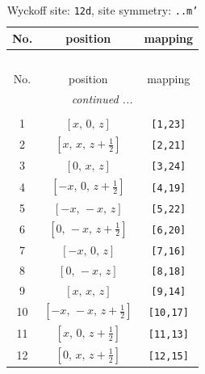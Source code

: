 \documentclass[fleqn,8pt]{jsarticle}
\begin{document}
\begin{longtable}{ccc}
\caption{Wyckoff site: {\tt 12d}, site symmetry: {\tt ..m'}}
 \\
 \hline \hline
No. & position & mapping \\ \hline \endfirsthead

\multicolumn{2}{l}{\tablename\ \thetable{}} \\
 \hline \hline
No. & position & mapping \\ \hline \endhead

 \hline \hline
\multicolumn{2}{r}{\footnotesize\it continued ...} \\ \endfoot

 \hline \hline
\multicolumn{2}{r}{} \\ \endlastfoot

1 & $\left[ x,\, 0,\, z \right]$ & {\tt [1,23]} \\ \hline
2 & $\left[ x,\, x,\, z + \frac{1}{2} \right]$ & {\tt [2,21]} \\ \hline
3 & $\left[ 0,\, x,\, z \right]$ & {\tt [3,24]} \\ \hline
4 & $\left[ - x,\, 0,\, z + \frac{1}{2} \right]$ & {\tt [4,19]} \\ \hline
5 & $\left[ - x,\, - x,\, z \right]$ & {\tt [5,22]} \\ \hline
6 & $\left[ 0,\, - x,\, z + \frac{1}{2} \right]$ & {\tt [6,20]} \\ \hline
7 & $\left[ - x,\, 0,\, z \right]$ & {\tt [7,16]} \\ \hline
8 & $\left[ 0,\, - x,\, z \right]$ & {\tt [8,18]} \\ \hline
9 & $\left[ x,\, x,\, z \right]$ & {\tt [9,14]} \\ \hline
10 & $\left[ - x,\, - x,\, z + \frac{1}{2} \right]$ & {\tt [10,17]} \\ \hline
11 & $\left[ x,\, 0,\, z + \frac{1}{2} \right]$ & {\tt [11,13]} \\ \hline
12 & $\left[ 0,\, x,\, z + \frac{1}{2} \right]$ & {\tt [12,15]} \\
\end{longtable}
\renewcommand{\arraystretch}{1.2}
\end{document}
